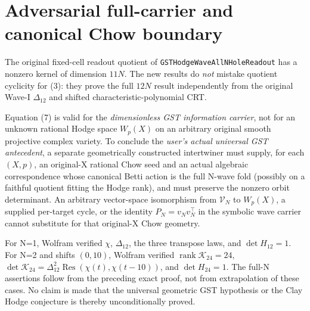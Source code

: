 \documentclass[11pt]{article}
\newcommand{\Res}{\operatorname{Res}}
\begin{document}
\section{Adversarial full-carrier and canonical Chow boundary}
The original fixed-cell readout quotient of \texttt{GSTHodgeWaveAllNHoleReadout} has a nonzero kernel of dimension $11N$. The new results do \emph{not} mistake quotient cyclicity for (3): they prove the full $12N$ result independently from the original Wave-I $\Delta_{12}$ and shifted characteristic-polynomial CRT.

Equation (7) is valid for the \emph{dimensionless GST information carrier}, not for an unknown rational Hodge space $W_p(X)$ on an arbitrary original smooth projective complex variety. To conclude the \emph{user's actual universal GST antecedent}, a separate geometrically constructed intertwiner must supply, for each $(X,p)$, an original-X rational Chow seed and an actual algebraic correspondence whose canonical Betti action is the full N-wave fold (possibly on a faithful quotient fitting the Hodge rank), and must preserve the nonzero orbit determinant. An arbitrary vector-space isomorphism from $\mathscr V_N$ to $W_p(X)$, a supplied per-target cycle, or the identity $P_N=v_Nv_N^\top$ in the symbolic wave carrier cannot substitute for that original-X Chow geometry.

For N=1, Wolfram verified $\chi$, $\Delta_{12}$, the three transpose laws, and $\det H_{12}=1$. For N=2 and shifts $(0,10)$, Wolfram verified $\operatorname{rank}\mathcal K_{24}=24$,
\(\det\mathcal K_{24}=\Delta_{12}^2\Res(\chi(t),\chi(t-10))\), and $\det H_{24}=1$. The full-N assertions follow from the preceding exact proof, not from extrapolation of these cases.
No claim is made that the universal geometric GST hypothesis or the Clay Hodge conjecture is thereby unconditionally proved.
\end{document}
